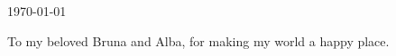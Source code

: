 \begin{titlepage}
\begin{center}
\begin{bottompar}


{\large \today}\\[2cm] %
\end{bottompar}
\end{center}
\end{titlepage}

\setcounter{tocdepth}{2}
\tableofcontents
\pagebreak


\clearpage
\begin{center}
    \thispagestyle{empty}
    \vspace*{\fill}
    To my beloved Bruna and Alba, for making my world a happy place.
    \vspace*{\fill}
\end{center}

\pagebreak